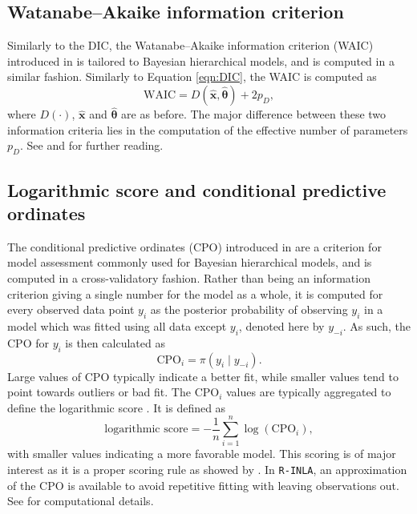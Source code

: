 \subsection*{Watanabe–Akaike information criterion}
\label{section:disease-mapping:criteria:WAIC}
Similarly to the DIC, the Watanabe–Akaike information criterion (WAIC) introduced in \cite{WAIC} is tailored to Bayesian hierarchical models, and is computed in a similar fashion. Similarly to Equation \eqref{eqn:DIC}, the WAIC is computed as
\begin{equation}
    \text{WAIC} = D( \hat{\pmb x}, \hat{\pmb \theta}) +  2p_D,
    \label{eqn:WAIC}
\end{equation}
where $D(\cdot)$, $\hat{\pmb x}$ and $\hat{\pmb\theta}$ are as before. The major difference between these two information criteria lies in the computation of the effective number of parameters $p_D$. See \cite{WAIC} and \cite{WAIC2} for further reading. 


\subsection*{Logarithmic score and conditional predictive ordinates}
\label{section:disease-mapping:criteria:CPO}
The conditional predictive ordinates (CPO) introduced in \cite{CPO} are a criterion for model assessment commonly used for Bayesian hierarchical models, and is computed in a cross-validatory fashion. Rather than being an information criterion giving a single number for the model as a whole, it is computed for every observed data point $y_i$ as the posterior probability of observing $y_i$ in a model which was fitted using all data except $y_i$, denoted here by $y_{-i}$. As such, the CPO for $y_i$ is then calculated as
\begin{equation}
    \text{CPO}_i = \pi(y_i \mid y_{-i}).
\end{equation}
Large values of CPO typically indicate a better fit, while smaller values tend to point towards outliers or bad fit. The $\text{CPO}_i$ values are typically aggregated to define the logarithmic score \citep{proper-scoring}. It is defined as 
\begin{equation}
    \text{logarithmic score} = -\frac{1}{n}\sum_{i=1}^n \log(\text{CPO}_i),
\end{equation}
with smaller values indicating a more favorable model. This scoring is of major interest as it is a proper scoring rule as showed by \cite{proper-scoring}. In \texttt{R-INLA}, an approximation of the CPO is available to avoid repetitive fitting with leaving observations out. See \cite{Held2010} for computational details.
